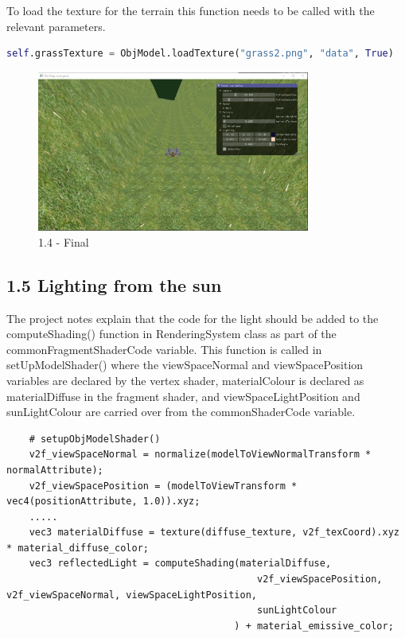 \documentclass[a4 paper, 12pt]{article}
\begin{document}
To load the texture for the terrain this function needs to be called with the relevant parameters.

    \begin{lstlisting}[language=python]   
    self.grassTexture = ObjModel.loadTexture("grass2.png", "data", True)
    \end{lstlisting}


    \begin{figure} [H]
        \centering
        \includegraphics[width=0.8\textwidth, frame]
            {./images/1.4.PNG}
        \caption{1.4 - Final}
    \end{figure}



\subsection{1.5 Lighting from the sun}  

The project notes explain that the code for the light should be added to the computeShading() function in RenderingSystem class as part of the commonFragmentShaderCode variable. This function is called in setUpModelShader() where the viewSpaceNormal and viewSpacePosition variables are declared by the vertex shader, materialColour is declared as materialDiffuse in the fragment shader, and viewSpaceLightPosition and sunLightColour are carried over from the commonShaderCode variable. 
    \begin{lstlisting}
    # setupObjModelShader()
    v2f_viewSpaceNormal = normalize(modelToViewNormalTransform * normalAttribute);
    v2f_viewSpacePosition = (modelToViewTransform * vec4(positionAttribute, 1.0)).xyz;
    .....
    vec3 materialDiffuse = texture(diffuse_texture, v2f_texCoord).xyz * material_diffuse_color;
    vec3 reflectedLight = computeShading(materialDiffuse, 
                                            v2f_viewSpacePosition, v2f_viewSpaceNormal, viewSpaceLightPosition, 
                                            sunLightColour
                                        ) + material_emissive_color;
    \end{lstlisting}
\end{document}
